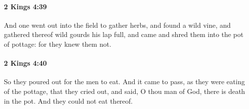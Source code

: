 		\paragraph{2 Kings 4:39} %
			\label{2KINGS-4-39}

			And one went out into the field to gather herbs, and found a wild vine, and gathered thereof wild gourds his lap full, and came and shred them into the pot of pottage: for they knew them not.


		\paragraph{2 Kings 4:40} %
			\label{2KINGS-4-40}

			So they poured out for the men to eat. And it came to pass, as they were eating of the pottage, that they cried out, and said, O thou man of God, there is death in the pot. And they could not eat thereof.

